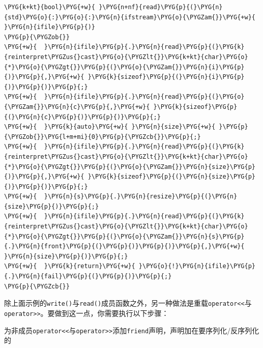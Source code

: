 \begin{itemize}

\begin{codeblockbg}
\begin{Verbatim}[commandchars=\\\{\},breaklines=true,breakanywhere=true,fontsize=\codefont,xleftmargin=17bp]
\PYG{k+kt}{bool}\PYG{+w}{ }\PYG{n+nf}{read}\PYG{p}{(}\PYG{n}{std}\PYG{o}{:}\PYG{o}{:}\PYG{n}{ifstream}\PYG{o}{\PYGZam{}}\PYG{+w}{ }\PYG{n}{ifile}\PYG{p}{)}
\PYG{p}{\PYGZob{}}
\PYG{+w}{  }\PYG{n}{ifile}\PYG{p}{.}\PYG{n}{read}\PYG{p}{(}\PYG{k}{reinterpret\PYGZus{}cast}\PYG{o}{\PYGZlt{}}\PYG{k+kt}{char}\PYG{o}{*}\PYG{o}{\PYGZgt{}}\PYG{p}{(}\PYG{o}{\PYGZam{}}\PYG{n}{i}\PYG{p}{)}\PYG{p}{,}\PYG{+w}{ }\PYG{k}{sizeof}\PYG{p}{(}\PYG{n}{i}\PYG{p}{)}\PYG{p}{)}\PYG{p}{;}
\PYG{+w}{  }\PYG{n}{ifile}\PYG{p}{.}\PYG{n}{read}\PYG{p}{(}\PYG{o}{\PYGZam{}}\PYG{n}{c}\PYG{p}{,}\PYG{+w}{ }\PYG{k}{sizeof}\PYG{p}{(}\PYG{n}{c}\PYG{p}{)}\PYG{p}{)}\PYG{p}{;}
\PYG{+w}{  }\PYG{k}{auto}\PYG{+w}{ }\PYG{n}{size}\PYG{+w}{ }\PYG{p}{\PYGZob{}}\PYG{l+m+mi}{0}\PYG{p}{\PYGZcb{}}\PYG{p}{;}
\PYG{+w}{  }\PYG{n}{ifile}\PYG{p}{.}\PYG{n}{read}\PYG{p}{(}\PYG{k}{reinterpret\PYGZus{}cast}\PYG{o}{\PYGZlt{}}\PYG{k+kt}{char}\PYG{o}{*}\PYG{o}{\PYGZgt{}}\PYG{p}{(}\PYG{o}{\PYGZam{}}\PYG{n}{size}\PYG{p}{)}\PYG{p}{,}\PYG{+w}{ }\PYG{k}{sizeof}\PYG{p}{(}\PYG{n}{size}\PYG{p}{)}\PYG{p}{)}\PYG{p}{;}
\PYG{+w}{  }\PYG{n}{s}\PYG{p}{.}\PYG{n}{resize}\PYG{p}{(}\PYG{n}{size}\PYG{p}{)}\PYG{p}{;}
\PYG{+w}{  }\PYG{n}{ifile}\PYG{p}{.}\PYG{n}{read}\PYG{p}{(}\PYG{k}{reinterpret\PYGZus{}cast}\PYG{o}{\PYGZlt{}}\PYG{k+kt}{char}\PYG{o}{*}\PYG{o}{\PYGZgt{}}\PYG{p}{(}\PYG{o}{\PYGZam{}}\PYG{n}{s}\PYG{p}{.}\PYG{n}{front}\PYG{p}{(}\PYG{p}{)}\PYG{p}{)}\PYG{p}{,}\PYG{+w}{ }\PYG{n}{size}\PYG{p}{)}\PYG{p}{;}
\PYG{+w}{  }\PYG{k}{return}\PYG{+w}{ }\PYG{o}{!}\PYG{n}{ifile}\PYG{p}{.}\PYG{n}{fail}\PYG{p}{(}\PYG{p}{)}\PYG{p}{;}
\PYG{p}{\PYGZcb{}}
\end{Verbatim}
\end{codeblockbg}

\end{itemize}



除上面示例的\texttt{write()}与\texttt{read()}成员函数之外，另一种做法是重载\texttt{operator<<}与\texttt{operator>>}。要做到这一点，你需要执行以下步骤：



为非成员\texttt{operator<<}与\texttt{operator>>}添加\texttt{friend}声明，声明加在要序列化/反序列化的



